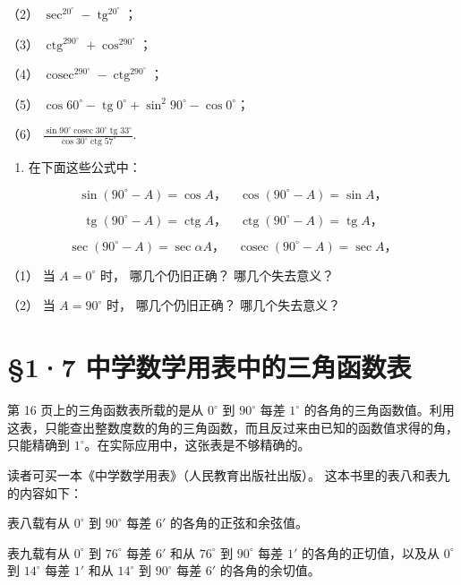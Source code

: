 （2） \(\sec^20^\circ - \operatorname{tg}^20^\circ\)；

（3） \(\operatorname{ctg}^290^\circ + \cos^290^\circ\)；

（4）
\(\operatorname{cosec}^290^\circ - \operatorname{ctg}^290^\circ\)；

（5）
\(\cos 60^{\circ} - \operatorname{tg} 0^{\circ} + \sin^{2} 90^{\circ} - \cos 0^{\circ}\)；

（6）
\(\frac{\sin 90^{\circ} \operatorname{cosec} 30^{\circ} \operatorname{tg} 33^{\circ}}{\cos 30^{\circ} \operatorname{ctg} 57^{\circ}}\).

\begin{enumerate}[start=5]
\item
  在下面这些公式中：
\end{enumerate}

\[
\sin (90 ^{\circ} - A) = \cos A\text{，} \quad \cos (90 ^{\circ} - A) = \sin A\text{，}
\]

\[
\operatorname{tg} (90 ^{\circ} - A) = \operatorname{ctg} A\text{，} \quad \operatorname{ctg} (90 ^{\circ} - A) = \operatorname{tg} A\text{，}
\]

\[
\sec (90 ^{\circ} - A) = \sec \alpha A\text{，} \quad \operatorname{cosec} (90 ^{\circ} - A) = \sec A\text{，}
\]

（1） 当 \(A=0^{\circ}\) 时， 哪几个仍旧正确？ 哪几个失去意义？

（2） 当 \(A=90^{\circ}\) 时， 哪几个仍旧正确？ 哪几个失去意义？

\section{§1·7 中学数学用表中的三角函数表}

第 16 页上的三角函数表所载的是从 \(0^{\circ}\) 到 \(90^{\circ}\) 每差
\(1^{\circ}\)
的各角的三角函数值。利用这表，只能查出整数度数的角的三角函数，而且反过来由已知的函数值求得的角，只能精确到
\(1^{\circ}\)。在实际应用中，这张表是不够精确的。

读者可买一本《中学数学用表》（人民教育出版社出版）。
这本书里的表八和表九的内容如下：

表八载有从 \(0^{\circ}\) 到 \(90^{\circ}\) 每差 \(6'\)
的各角的正弦和余弦值。

表九载有从 \(0^{\circ}\) 到 \(76^{\circ}\) 每差 \(6'\) 和从
\(76^{\circ}\) 到 \(90^{\circ}\) 每差 \(1'\) 的各角的正切值，以及从
\(0^{\circ}\) 到 \(14^{\circ}\) 每差 \(1'\) 和从 \(14^{\circ}\) 到
\(90^{\circ}\) 每差 \(6'\) 的各角的余切值。


